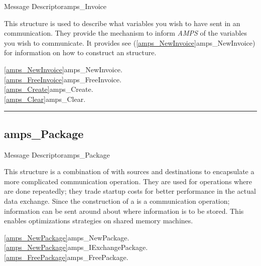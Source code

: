 \begin{deftp}{Message Descriptor}{amps\_Invoice}

\DESCRIPTION

This structure is used to describe what variables you wish to have
sent in an  communication.  They provide the mechanism to
inform {\em AMPS} of the variables you wish to communicate.  It
provides see (\vref{amps_NewInvoice}{amps\_NewInvoice}) for
information on how to construct an  structure.

\SEEALSO
\vref{amps_NewInvoice}{amps\_NewInvoice}. \\
\vref{amps_FreeInvoice}{amps\_FreeInvoice}. \\
\vref{amps_Create}{amps\_Create}. \\
\vref{amps_Clear}{amps\_Clear}. \\

\end{deftp}



\noindent\rule{\textwidth}{1mm}

\subsection{amps\_Package}
\label{amps_Package}


\begin{deftp}{Message Descriptor}{amps\_Package}


\DESCRIPTION

This structure is a combination of  with sources
and destinations to encapsulate a more complicated communication
operation.  They are used for operations where are done repeatedly;
they trade startup costs for better performance in the actual data
exchange.  Since the construction of a  is a
communication operation; information can be sent around about where
information is to be stored.  This enables optimizations strategies on
shared memory machines.

\SEEALSO
\vref{amps_NewPackage}{amps\_NewPackage}. \\
\vref{amps_NewPackage}{amps\_IExchangePackage}. \\
\vref{amps_FreePackage}{amps\_FreePackage}. \\

\end{deftp}

